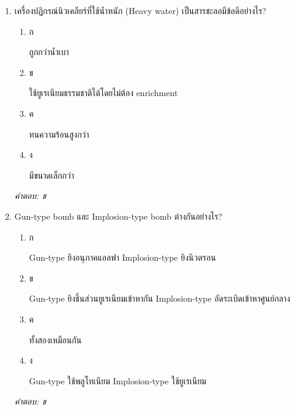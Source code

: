 \documentclass[12pt]{article}
\begin{document}
\begin{enumerate}[label=\arabic*., itemsep=0.5\baselineskip, topsep=0.5\baselineskip, leftmargin=*]
\item เครื่องปฏิกรณ์นิวเคลียร์ที่ใช้น้ำหนัก (Heavy water) เป็นสารชะลอมีข้อดีอย่างไร?
\begin{enumerate}[label=\alph*)., itemsep=0.3\baselineskip, topsep=0.3\baselineskip]
\item ก\ 
\begin{minipage}[t]{0.9\linewidth}
\raggedright ถูกกว่าน้ำเบา
\end{minipage}
\item ข\ 
\begin{minipage}[t]{0.9\linewidth}
\raggedright ใช้ยูเรเนียมธรรมชาติได้โดยไม่ต้อง enrichment
\end{minipage}
\item ค\ 
\begin{minipage}[t]{0.9\linewidth}
\raggedright ทนความร้อนสูงกว่า
\end{minipage}
\item ง\ 
\begin{minipage}[t]{0.9\linewidth}
\raggedright มีขนาดเล็กกว่า
\end{minipage}
\end{enumerate}
\vspace{-0.3\baselineskip}
\begin{small}
\textit{คำตอบ: ข}
\end{small}

\item Gun-type bomb และ Implosion-type bomb ต่างกันอย่างไร?
\begin{enumerate}[label=\alph*)., itemsep=0.3\baselineskip, topsep=0.3\baselineskip]
\item ก\ 
\begin{minipage}[t]{0.9\linewidth}
\raggedright Gun-type ยิงอนุภาคแอลฟา Implosion-type ยิงนิวตรอน
\end{minipage}
\item ข\ 
\begin{minipage}[t]{0.9\linewidth}
\raggedright Gun-type ยิงชิ้นส่วนยูเรเนียมเข้าหากัน Implosion-type อัดระเบิดเข้าหาศูนย์กลาง
\end{minipage}
\item ค\ 
\begin{minipage}[t]{0.9\linewidth}
\raggedright ทั้งสองเหมือนกัน
\end{minipage}
\item ง\ 
\begin{minipage}[t]{0.9\linewidth}
\raggedright Gun-type ใช้พลูโทเนียม Implosion-type ใช้ยูเรเนียม
\end{minipage}
\end{enumerate}
\vspace{-0.3\baselineskip}
\begin{small}
\textit{คำตอบ: ข}
\end{small}


\end{enumerate}
\end{document}
